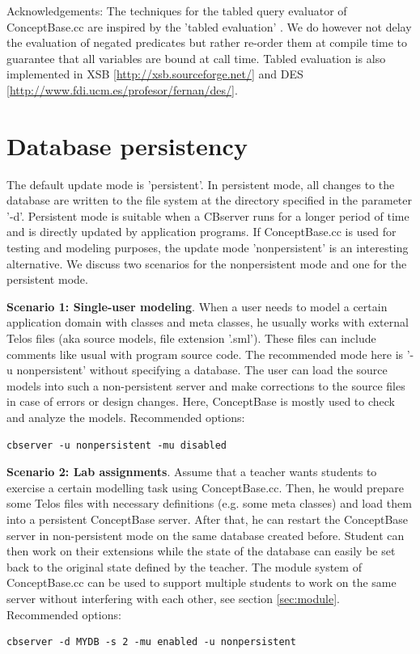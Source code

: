 Acknowledgements: The techniques for the
tabled query evaluator of ConceptBase.cc are inspired by the 'tabled evaluation' \cite{ssw94,chenwarren96}.
We do however not delay the evaluation of negated predicates but rather re-order
them at compile time to guarantee that all variables are bound at call time.
Tabled evaluation is also implemented in XSB [\url{http://xsb.sourceforge.net/}]
and DES [\url{http://www.fdi.ucm.es/profesor/fernan/des/}].


\section{Database persistency}
\label{sec:persistency}

The default update mode is 'persistent'. In persistent mode, all changes
to the database are written to the file system at the directory specified in
the parameter '-d'. Persistent mode is suitable when a CBserver
runs for a longer period of time and is directly updated by
application programs. 
If ConceptBase.cc is used for testing and modeling
purposes, the update mode 'nonpersistent' is an interesting alternative.
We discuss two scenarios for the nonpersistent mode and one for the
persistent mode.
\newline

{\bf Scenario 1: Single-user modeling}. When a user needs to model a certain
application domain with classes and meta classes, he usually works
with external Telos files (aka source models, file extension '.sml').
These files can include comments like usual with program source code.
The recommended mode here is '-u nonpersistent' without specifying a
database. The user can load the source models
into such a non-persistent server and make corrections to the source
files in case of errors or design changes. Here, ConceptBase is
mostly used to check and analyze the models.
Recommended options:
\begin{verbatim}
cbserver -u nonpersistent -mu disabled
\end{verbatim}

{\bf Scenario 2: Lab assignments}.
Assume that a teacher wants students to exercise a certain modelling task
using ConceptBase.cc. Then, he would prepare some Telos files with necessary
definitions (e.g. some meta classes) and load them into a persistent
ConceptBase server. After that, he can restart the ConceptBase server
in non-persistent mode on the same database created before. Student
can then work on their extensions while the state of the database
can easily be set back to the original state defined by the teacher.
The module system of ConceptBase.cc can be used to support multiple
students to work on the same server without interfering with each other,
see section \ref{sec:module}.
Recommended options:
\begin{verbatim}
cbserver -d MYDB -s 2 -mu enabled -u nonpersistent
\end{verbatim}

